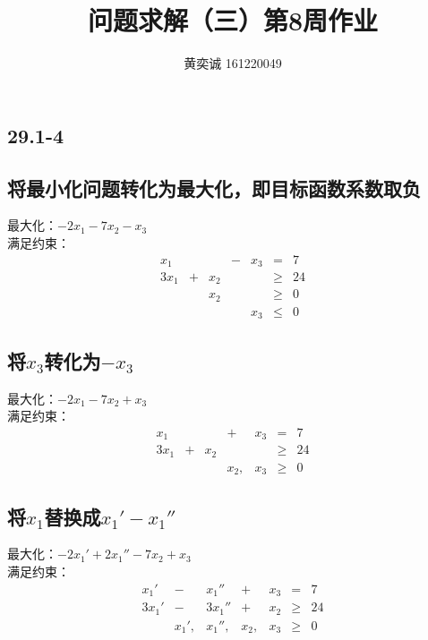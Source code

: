 \documentclass[twocolumn]{article}
\newenvironment{SChinese}{%
	\CJKfamily{gbsn}%
	\CJKtilde
	\CJKnospace}{}
\begin{document}
	\begin{CJK}{UTF8}{}	
		\begin{SChinese}	
			\title{问题求解（三）第8周作业}
			\author{黄奕诚 161220049}
			\maketitle
			
			\section*{29.1-4}
				\subsection*{将最小化问题转化为最大化，即目标函数系数取负}
				最大化：$-2x_1-7x_2-x_3$\\
				满足约束：\begin{displaymath}
				\begin{matrix}
				x_1 &  &  & - & x_3 & = & 7 \\
				3x_1 & + & x_2 &  &  & \ge & 24 \\
				 &  & x_2 &  &  & \ge & 0 \\
				 &  &  &  & x_3 & \le & 0 
				\end{matrix}
				\end{displaymath}
				\subsection*{将$x_3$转化为$-x_3$}
				最大化：$-2x_1-7x_2+x_3$\\
				满足约束：\begin{displaymath}
				\begin{matrix}
				x_1 &  &  & + & x_3 & = & 7 \\
				3x_1 & + & x_2 &  &  & \ge & 24 \\
				&  &  & x_2, & x_3 & \ge & 0 
				\end{matrix}
				\end{displaymath}
				\subsection*{将$x_1$替换成$x_1'-x_1''$}
				最大化：$-2x_1'+2x_1''-7x_2+x_3$\\
				满足约束：\begin{displaymath}
				\begin{matrix}
				x_1' & - & x_1'' & + & x_3 & = & 7 \\
				3x_1' & - & 3x_1'' & + & x_2 & \ge & 24 \\
				& x_1', & x_1'', & x_2, & x_3 & \ge & 0 
				\end{matrix}
				\end{displaymath}

\end{SChinese}
\end{CJK}
\end{document}
